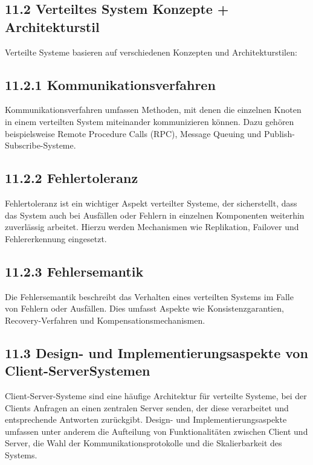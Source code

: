 \documentclass[10pt]{article}
\begin{document}
\subsection*{11.2 Verteiltes System Konzepte + Architekturstil}
Verteilte Systeme basieren auf verschiedenen Konzepten und Architekturstilen:

\subsection*{11.2.1 Kommunikationsverfahren}
Kommunikationsverfahren umfassen Methoden, mit denen die einzelnen Knoten in einem verteilten System miteinander kommunizieren können. Dazu gehören beispielsweise Remote Procedure Calls (RPC), Message Queuing und Publish-Subscribe-Systeme.

\subsection*{11.2.2 Fehlertoleranz}
Fehlertoleranz ist ein wichtiger Aspekt verteilter Systeme, der sicherstellt, dass das System auch bei Ausfällen oder Fehlern in einzelnen Komponenten weiterhin zuverlässig arbeitet. Hierzu werden Mechanismen wie Replikation, Failover und Fehlererkennung eingesetzt.

\subsection*{11.2.3 Fehlersemantik}
Die Fehlersemantik beschreibt das Verhalten eines verteilten Systems im Falle von Fehlern oder Ausfällen. Dies umfasst Aspekte wie Konsistenzgarantien, Recovery-Verfahren und Kompensationsmechanismen.

\subsection*{11.3 Design- und Implementierungsaspekte von Client-ServerSystemen}
Client-Server-Systeme sind eine häufige Architektur für verteilte Systeme, bei der Clients Anfragen an einen zentralen Server senden, der diese verarbeitet und entsprechende Antworten zurückgibt. Design- und Implementierungsaspekte umfassen unter anderem die Aufteilung von Funktionalitäten zwischen Client und Server, die Wahl der Kommunikationsprotokolle und die Skalierbarkeit des Systems.
\end{document}

